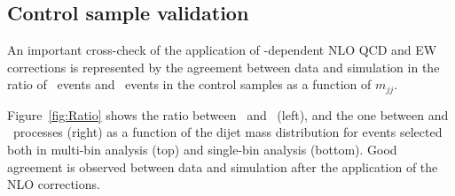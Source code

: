 \subsection{Control sample validation}

An important cross-check of the application of \pt-dependent NLO QCD and EW corrections
is represented by the agreement between data and simulation in the ratio of 
\Zjets~events and \Wjets~events in the control samples as a function of $m_{jj}$. 

Figure~\ref{fig:Ratio} shows the ratio between \Zmmjets~and \Wmnjets~(left), 
and the one between \Zeejets and \Wenjets~processes (right) as a function of the dijet mass distribution for 
events selected both in multi-bin analysis (top) and single-bin analysis (bottom).
Good agreement is observed between data and simulation after the application of the NLO corrections. 

